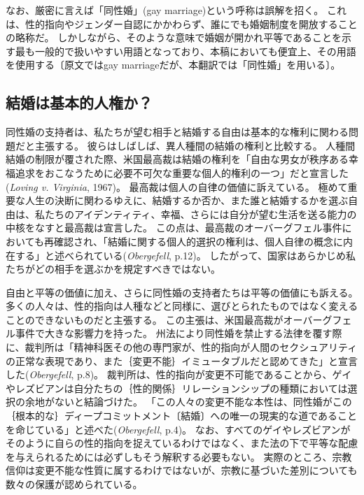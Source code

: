 \documentclass[paper=a4,book,openany]{jlreq}
\begin{document}
なお、厳密に言えば「同性婚」(gay marriage)という呼称は誤解を招く。
これは、性的指向やジェンダー自認にかかわらず、誰にでも婚姻制度を開放することの略称だ。
しかしながら、そのような意味で婚姻が開かれ平等であることを示す最も一般的で扱いやすい用語となっており、本稿においても便宜上、その用語を使用する〔原文ではgay marriageだが、本翻訳では「同性婚」を用いる〕。

\subsection{結婚は基本的人権か？}

同性婚の支持者は、私たちが望む相手と結婚する自由は基本的な権利に関わる問題だと主張する。
彼らはしばしば、異人種間の結婚の権利と比較する。
人種間結婚の制限が覆された際、米国最高裁は結婚の権利を「自由な男女が秩序ある幸福追求をおこなうために必要不可欠な重要な個人的権利の一つ」だと宣言した(\emph{Loving v. Virginia}, 1967)。
最高裁は個人の自律の価値に訴えている。
極めて重要な人生の決断に関わるゆえに、結婚するか否か、また誰と結婚するかを選ぶ自由は、私たちのアイデンティティ、幸福、さらには自分が望む生活を送る能力の中核をなすと最高裁は宣言した。
この点は、最高裁のオーバーグフェル事件においても再確認され、「結婚に関する個人的選択の権利は、個人自律の概念に内在する」と述べられている(\emph{Obergefell}, p.12)。
したがって、国家はあらかじめ私たちがどの相手を選ぶかを規定すべきではない。

自由と平等の価値に加え、さらに同性婚の支持者たちは平等の価値にも訴える。
多くの人々は、性的指向は人種などと同様に、選びとられたものではなく変えることのできないものだと主張する。
この主張は、米国最高裁がオーバーグフェル事件で大きな影響力を持った。
州法により同性婚を禁止する法律を覆す際に、裁判所は「精神科医その他の専門家が、性的指向が人間のセクシュアリティの正常な表現であり、また｛変更不能｝{イミュータブル}だと認めてきた」と宣言した(\emph{Obergefell}, p.8)。
裁判所は、性的指向が変更不可能であることから、ゲイやレズビアンは自分たちの｛性的関係｝{リレーションシップ}の種類においては選択の余地がないと結論づけた。
「この人々の変更不能な本性は、同性婚がこの｛根本的な｝{ディープ}コミットメント〔結婚〕への唯一の現実的な道であることを命じている」と述べた(\emph{Obergefell}, p.4)。
なお、すべてのゲイやレズビアンがそのように自らの性的指向を捉えているわけではなく、また法の下で平等な配慮を与えられるためには必ずしもそう解釈する必要もない。
実際のところ、宗教信仰は変更不能な性質に属するわけではないが、宗教に基づいた差別についても数々の保護が認められている。
\end{document}
